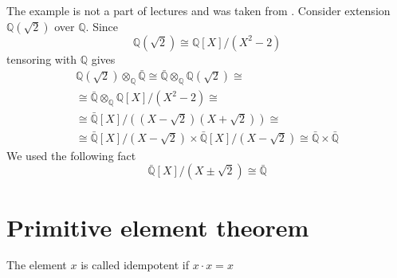 \begin{example}
  The example is not a part of lectures and was taken from
  \cite{bib:KeithConradSeparability2}.
  Consider extension $\mathbb{Q}\left(\sqrt{2}\right)$ over
  $\mathbb{Q}$. Since
  \[
  \mathbb{Q}\left(\sqrt{2}\right) \cong
  \mathbb{Q}\left[X\right]/\left(X^2 - 2\right)
  \]
  tensoring with $\mathbb{Q}$ gives
  \begin{eqnarray}
    \mathbb{Q}\left(\sqrt{2}\right) \otimes_{\mathbb{Q}}
    \bar{\mathbb{Q}} \cong
    \bar{\mathbb{Q}} \otimes_{\mathbb{Q}}
    \mathbb{Q}\left(\sqrt{2}\right)
    \cong
    \nonumber \\
    \cong
    \bar{\mathbb{Q}} \otimes_{\mathbb{Q}}
    \mathbb{Q}\left[X\right]/\left(X^2 - 2\right)
    \cong
    \nonumber \\
    \cong
    \bar{\mathbb{Q}}\left[X\right]/
    \left(
    \left(X - \sqrt{2}\right)
    \left(X + \sqrt{2}\right)
    \right)
    \cong
    \nonumber \\
    \cong
    \bar{\mathbb{Q}}\left[X\right]/\left(X - \sqrt{2}\right)
    \times
    \bar{\mathbb{Q}}\left[X\right]/\left(X - \sqrt{2}\right)
    \cong
    \bar{\mathbb{Q}} \times \bar{\mathbb{Q}}
    \nonumber
  \end{eqnarray}
  We used the following fact
  \[
  \bar{\mathbb{Q}}\left[X\right]/\left(X \pm \sqrt{2}\right)
  \cong
  \bar{\mathbb{Q}}
  \]  
  \label{ex:lec5_conrad}
\end{example}

\section{Primitive element theorem}

\begin{definition}[Idempotent]
  The element $x$ is called idempotent if $x \cdot x = x$
  \label{def:idempotent}
\end{definition}

